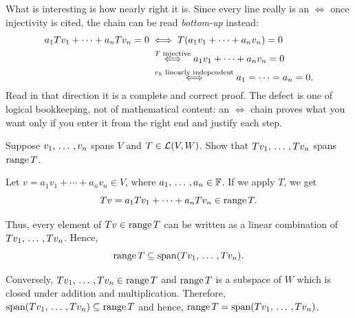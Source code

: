 \begin{xrcs}
\begin{ainote}
    What is interesting is how nearly right it is. Since every line really is an $\iff$ once injectivity is cited, the chain can be read \emph{bottom-up} instead:
    \begin{equation}
      \begin{aligned}
        a_1 T v_1 + \cdots + a_n T v_n = 0
        &\iff T(a_1 v_1 + \cdots + a_n v_n) = 0 \\
        &\;\overset{\text{\scriptsize$T$ injective}}{\iff} a_1 v_1 + \cdots + a_n v_n = 0 \\
        &\;\overset{\text{\scriptsize$v_k$ linearly independent}}{\iff} a_1 = \cdots = a_n = 0.
      \end{aligned}
    \end{equation}
    Read in that direction it is a complete and correct proof. The defect is one of logical bookkeeping, not of mathematical content: an $\iff$ chain proves what you want only if you enter it from the right end and justify each step.
  \end{ainote}
\end{xrcs}

\begin{xrcs}
  Suppose $v_1, {\, \ldots \,\,}, v_n$ spans $V$ and $T \in \mathcal{L}(V,W)$. Show that $Tv_1, {\, \ldots \,\,}, Tv_n$ spans $\operatorname{range} T$.

  \begin{xprf}
    Let $v = a_1 v_1 + \cdots + a_n v_n \in V$, where $a_1, {\, \ldots \,\,}, a_n \in \mathbb{F}$. If we apply $T$, we get
    \begin{equation}
      Tv = a_1 T v_1 + \cdots + a_n T v_n \in \operatorname{range} T.
    \end{equation}

    Thus, every element of $Tv \in \operatorname{range} T$ can be written as a linear combination of $Tv_1, {\, \ldots \,\,}, Tv_n$. Hence,
    \begin{equation}
      \operatorname{range} T \subseteq \operatorname{span} (T v_1, {\, \ldots \,\,}, T v_n).
    \end{equation}

    Conversely, \( Tv_1, {\, \ldots \,\,}, Tv_n \in \operatorname{range} T \) and $\operatorname{range} T$ is a subspace of $W$ which is closed under addition and multiplication. Therefore, $\operatorname{span} (Tv_1, {\, \ldots \,\,}, Tv_n) \subseteq \operatorname{range} T$ and hence, $\operatorname{range} T = \operatorname{span} (Tv_1, {\, \ldots \,\,}, Tv_n)$.
  \end{xprf}
\end{xrcs}


